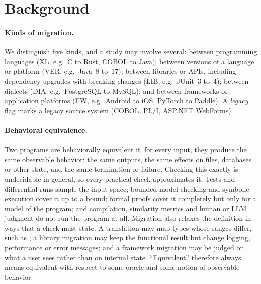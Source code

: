 \section{Background}
\label{sec:background}

\paragraph{Kinds of migration.} We distinguish five kinds, and a study may involve several: between programming languages (XL, e.g.\ C to Rust, COBOL to Java); between versions of a language or platform (VER, e.g.\ Java~8 to~17); between libraries or APIs, including dependency upgrades with breaking changes (LIB, e.g.\ JUnit~3 to~4); between dialects (DIA, e.g.\ PostgreSQL to MySQL); and between frameworks or application platforms (FW, e.g.\ Android to iOS, PyTorch to Paddle). A \emph{legacy} flag marks a legacy source system (COBOL, PL/I, ASP.NET WebForms). 

\begin{added}
\paragraph{Behavioral equivalence.} Two programs are behaviorally equivalent if, for every input, they produce the same observable behavior: the same outputs, the same effects on files, databases or other state, and the same termination or failure. Checking this exactly is undecidable in general, so every practical check approximates it. Tests and differential runs sample the input space; bounded model checking and symbolic execution cover it up to a bound; formal proofs cover it completely but only for a model of the program; and compilation, similarity metrics and human or LLM judgment do not run the program at all. Migration also relaxes the definition in ways that a check must state. A translation may map types whose ranges differ, such as ; a library migration may keep the functional result but change logging, performance or error messages; and a framework migration may be judged on what a user sees rather than on internal state. ``Equivalent'' therefore always means equivalent with respect to some oracle and some notion of observable behavior.
\end{added}

